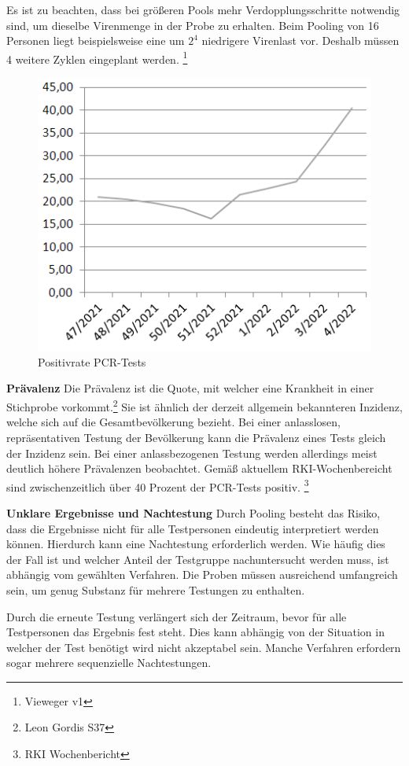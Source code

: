 Es ist zu beachten, dass bei größeren Pools mehr Verdopplungsschritte notwendig sind, um dieselbe Virenmenge in der Probe zu erhalten.
Beim Pooling von 16 Personen liegt beispielsweise eine um $2^{4}$ niedrigere Virenlast vor.
Deshalb müssen 4 weitere Zyklen eingeplant werden.
\footnote{Vieweger v1}


\begin{figure}
	\includegraphics[width=.5\textwidth]{img/RKI_PCR_Positivrate}
	\caption{Positivrate PCR-Tests\footnotemark}
\end{figure}

\textbf{Prävalenz}\newline
Die Prävalenz ist die Quote, mit welcher eine Krankheit in einer Stichprobe vorkommt.\footnote{Leon Gordis S37}
Sie ist ähnlich der derzeit allgemein bekannteren Inzidenz, welche sich auf die Gesamtbevölkerung bezieht.
Bei einer anlasslosen, repräsentativen Testung der Bevölkerung kann die Prävalenz eines Tests gleich der Inzidenz sein.
Bei einer anlassbezogenen Testung werden allerdings meist deutlich höhere Prävalenzen beobachtet.
Gemäß aktuellem RKI-Wochenbereicht sind zwischenzeitlich über 40 Prozent der PCR-Tests positiv.
\footnote{RKI Wochenbericht}

\textbf{Unklare Ergebnisse und Nachtestung}\newline
Durch Pooling besteht das Risiko, dass die Ergebnisse nicht für alle Testpersonen eindeutig interpretiert werden können.
Hierdurch kann eine Nachtestung erforderlich werden.
Wie häufig dies der Fall ist und welcher Anteil der Testgruppe nachuntersucht werden muss, ist abhängig vom gewählten Verfahren.
Die Proben müssen ausreichend umfangreich sein, um genug Substanz für mehrere Testungen zu enthalten.

Durch die erneute Testung verlängert sich der Zeitraum, bevor für alle Testpersonen das Ergebnis fest steht.
Dies kann abhängig von der Situation in welcher der Test benötigt wird nicht akzeptabel sein.
Manche Verfahren erfordern sogar mehrere sequenzielle Nachtestungen.

